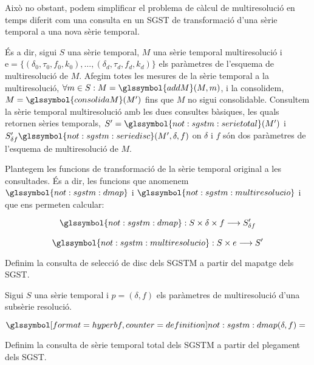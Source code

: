 Això no obstant, podem simplificar el problema de càlcul de
multiresolució en temps diferit com una consulta en un \gls{SGST} de
transformació d'una sèrie temporal a una nova sèrie temporal.

És a dir, sigui $S$ una sèrie temporal, $M$ una sèrie temporal
multiresolució i $\text{e} = \{ (\delta_0,\tau_0,f_0,k_0), \ldots,
(\delta_d,\tau_d,f_d,k_d)\}$ els paràmetres de l'esquema de
multiresolució de $M$. Afegim totes les mesures de la sèrie temporal a
la multiresolució, $\forall m \in S:
M=\glssymbol{addM}(M,m)$, i la
consolidem, $M=\glssymbol{consolidaM}(M')$ fins que $M$ no sigui
consolidable. Consultem la sèrie temporal multiresolució amb les dues
consultes bàsiques, les quals retornen sèries temporals,
$S'=\glssymbol{not:sgstm:serietotal}(M')$ i $S_{\delta
  f}'\glssymbol{not:sgstm:seriedisc}(M',\delta,f)$ on $\delta$ i $f$
són dos paràmetres de l'esquema de multiresolució de $M$.



Plantegem les funcions de transformació de la sèrie temporal original
a les consultades. És a dir, les funcions que anomenem
$\glssymbol{not:sgstm:dmap}$ i $\glssymbol{not:sgstm:multiresolucio}$
i que ens permeten calcular:

\[
\glssymbol{not:sgstm:dmap}: S \times \delta \times f \longrightarrow
S'_{\delta f}
\]


\[
 \glssymbol{not:sgstm:multiresolucio}: S \times e  \longrightarrow S'
\]



Definim la consulta de selecció de disc dels \gls{SGSTM} a
partir del mapatge dels \gls{SGST}.
\begin{definition}
  Sigui $S$ una sèrie temporal i $p=(\delta,f)$ els paràmetres de
  multiresolució d'una subsèrie resolució.


$\glssymboldef{not:sgstm:dmap}(\delta,f)=$

\end{definition}


Definim la consulta de sèrie temporal total dels \gls{SGSTM} a partir
del plegament dels \gls{SGST}.
\begin{definition}
\end{definition}






